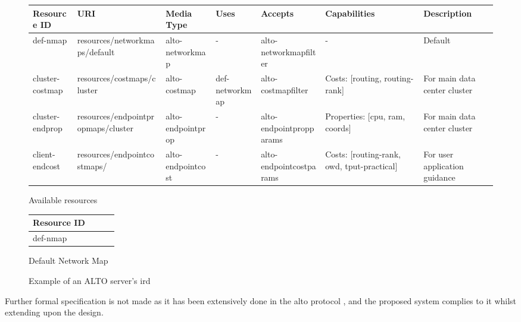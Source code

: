 \begin{figure}[H]
        \begin{subtable}{1\linewidth}
        \centering
        \hspace*{-8em}
        \tiny
        \begin{tabular}{|l|l|l|l|l|l|l|}
        \hline
        Resource ID             & URI                                & Media Type        & Uses           & Accepts                 & Capabilities                                              & Description                                   \\ \hline
        def-nmap          & resources/networkmaps/default      & alto-networkmap   & -              & alto-networkmapfilter   & -                                                         & Default                           \\ \hline
        cluster-costmap         & resources/costmaps/cluster         & alto-costmap      & def-networkmap & alto-costmapfilter      & Costs: {[}routing, routing-rank{]} & For main data center cluster         \\ \hline
        cluster-endprop   & resources/endpointpropmaps/cluster & alto-endpointprop & -              & alto-endpointpropparams & Properties: {[}cpu, ram, coords{]} & For main data center cluster \\ \hline
        client-endcost & resources/endpointcostmaps/        & alto-endpointcost & -              & alto-endpointcostparams & Costs: {[}routing-rank, owd, tput-practical{]}            & For user application guidance       \\ \hline
        \end{tabular}
        \caption{Available resources}
        \end{subtable}
        \begin{subtable}{1\linewidth}
        \centering
        \begin{tabular}{|l|l|l|L|}
        \hline
        \bf{Resource ID} \\ \hline
        def-nmap         \\ \hline
        \end{tabular}
        \caption{Default Network Map}
        \end{subtable}

    \caption{Example of an \gls{ALTO} server's \gls{ird}}
    \label{table:ird-example}
\end{figure}

Further formal specification is not made as it has been extensively done in the \gls{alto} protocol \cite{alto-protocol}, and the proposed system complies to it whilst extending upon the design.

